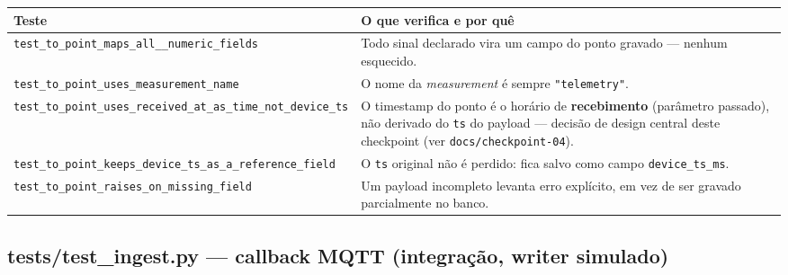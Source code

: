 \documentclass[10pt,a4paper]{article}
\begin{document}
\begin{center}
\begin{longtable}{L{5cm}L{9.5cm}}
\toprule
\textbf{Teste} & \textbf{O que verifica e por quê} \\
\midrule
\endhead
\texttt{test\_\allowbreak to\_\allowbreak point\_\allowbreak maps\_\allowbreak all\_\_\allowbreak numeric\_\allowbreak fields} & Todo sinal declarado vira um campo do ponto gravado — nenhum esquecido. \\
\texttt{test\_\allowbreak to\_\allowbreak point\_\allowbreak uses\_\allowbreak measurement\_\allowbreak name} & O nome da \textit{measurement} é sempre \texttt{"telemetry"}. \\
\texttt{test\_\allowbreak to\_\allowbreak point\_\allowbreak uses\_\allowbreak received\_\allowbreak at\_\allowbreak as\_\allowbreak time\_\allowbreak not\_\allowbreak device\_\allowbreak ts} & O timestamp do ponto é o horário de \textbf{recebimento} (parâmetro passado), não derivado do \texttt{ts} do payload — decisão de design central deste checkpoint (ver \texttt{docs/checkpoint-04}). \\
\texttt{test\_\allowbreak to\_\allowbreak point\_\allowbreak keeps\_\allowbreak device\_\allowbreak ts\_\allowbreak as\_\allowbreak a\_\allowbreak reference\_\allowbreak field} & O \texttt{ts} original não é perdido: fica salvo como campo \texttt{device\_\allowbreak ts\_\allowbreak ms}. \\
\texttt{test\_\allowbreak to\_\allowbreak point\_\allowbreak raises\_\allowbreak on\_\allowbreak missing\_\allowbreak field} & Um payload incompleto levanta erro explícito, em vez de ser gravado parcialmente no banco. \\
\bottomrule
\end{longtable}
\end{center}

\subsection{tests/test\_\allowbreak ingest.py --- callback MQTT (integração, writer simulado)}
\end{document}
